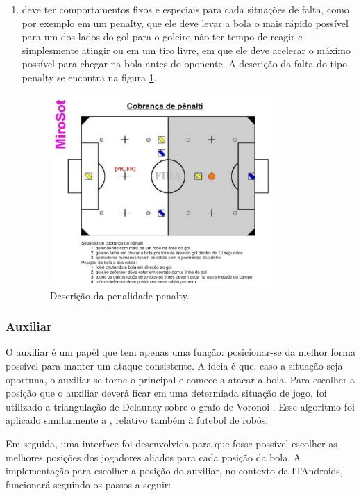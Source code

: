 \documentclass[a4paper,12pt]{article}
\begin{document}
\begin{enumerate}
 
\item deve ter comportamentos fixos e especiais para cada situações de falta, como por exemplo em um penalty, que ele deve levar a bola o mais rápido possível para um dos lados do gol para o goleiro não ter tempo de reagir e simplesmente atingir ou em um tiro livre, em que ele deve acelerar o máximo possível para chegar na bola antes do oponente. A descrição da falta do tipo penalty se encontra na figura \ref{fig:penalty}.

\begin{figure}[H]
	\centering
	\includegraphics[width=0.8\textwidth]{figures/campo_penalty.png}
   \caption{Descrição da penalidade penalty.} \label{fig:penalty}
\end{figure}


\end{enumerate}




\subsubsection{Auxiliar} 

O auxiliar é um papél que tem apenas uma função: posicionar-se da melhor forma possível para manter um ataque consistente. A ideia é que, caso a situação seja oportuna, o auxiliar se torne o principal e comece a atacar a bola. Para escolher a posição que o auxiliar deverá ficar em uma determiada situação de jogo, foi utilizado a triangulação de Delaunay \cite{delaunay34} sobre o grafo de Voronoi \cite{voronoi08}. Esse algoritmo foi aplicado similarmente a \cite{akiyama2007multi}, relativo também à futebol de robôs.

Em seguida, uma interface foi desenvolvida para que fosse possível escolher as melhores posições dos jogadores aliados para cada posição da bola. A implementação para escolher a posição do auxiliar, no contexto da ITAndroids, funcionará seguindo os passos a seguir:
\end{document}
